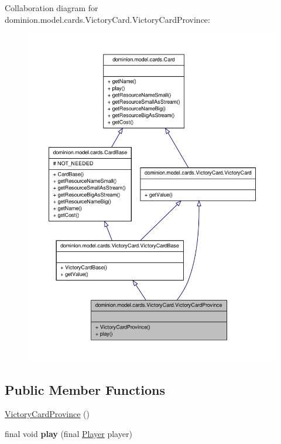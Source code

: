 \-Collaboration diagram for dominion.\-model.\-cards.\-Victory\-Card.\-Victory\-Card\-Province\-:
\nopagebreak
\begin{figure}[H]
\begin{center}
\leavevmode
\includegraphics[width=350pt]{classdominion_1_1model_1_1cards_1_1VictoryCard_1_1VictoryCardProvince__coll__graph}
\end{center}
\end{figure}
\subsection*{\-Public \-Member \-Functions}
\begin{DoxyCompactItemize}
\item 
\hyperlink{classdominion_1_1model_1_1cards_1_1VictoryCard_1_1VictoryCardProvince_a3246887f47215786e9e11de31a0954d8}{\-Victory\-Card\-Province} ()
\item 
\hypertarget{classdominion_1_1model_1_1cards_1_1VictoryCard_1_1VictoryCardProvince_ab1cb1e325f288359bb4e0fc3704db5d1}{final void {\bfseries play} (final \hyperlink{interfacedominion_1_1model_1_1Player}{\-Player} player)}\label{classdominion_1_1model_1_1cards_1_1VictoryCard_1_1VictoryCardProvince_ab1cb1e325f288359bb4e0fc3704db5d1}

\end{DoxyCompactItemize}



